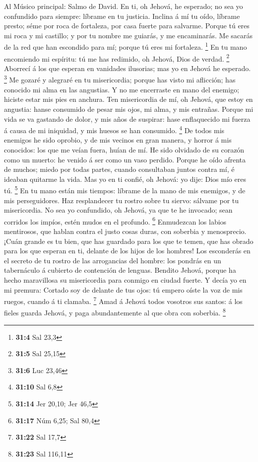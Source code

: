  Al Músico principal: Salmo de David. En ti, oh Jehová, he
esperado; no sea yo confundido para siempre: líbrame en tu justicia.
 Inclina á mí tu oído, líbrame presto; séme por roca de
fortaleza, por casa fuerte para salvarme.  Porque tú eres mi
roca y mi castillo; y por tu nombre me guiarás, y me encaminarás.
 Me sacarás de la red que han escondido para mí; porque tú
eres mi fortaleza. \footnote{\textbf{31:4} Sal 23,3}  En tu
mano encomiendo mi espíritu: tú me has redimido, oh Jehová, Dios de
verdad. \footnote{\textbf{31:5} Sal 25,15}  Aborrecí á los
que esperan en vanidades ilusorias; mas yo en Jehová he esperado.
\footnote{\textbf{31:6} Luc 23,46}  Me gozaré y alegraré en
tu misericordia; porque has visto mi aflicción; has conocido mi alma en
las angustias.  Y no me encerraste en mano del enemigo;
hiciste estar mis pies en anchura.  Ten misericordia de mí,
oh Jehová, que estoy en angustia: hanse consumido de pesar mis ojos, mi
alma, y mis entrañas.  Porque mi vida se va gastando de
dolor, y mis años de suspirar: hase enflaquecido mi fuerza á causa de mi
iniquidad, y mis huesos se han consumido. \footnote{\textbf{31:10} Sal
  6,8}  De todos mis enemigos he sido oprobio, y de mis
vecinos en gran manera, y horror á mis conocidos: los que me veían
fuera, huían de mí.  He sido olvidado de su corazón como un
muerto: he venido á ser como un vaso perdido.  Porque he
oído afrenta de muchos; miedo por todas partes, cuando consultaban
juntos contra mí, é ideaban quitarme la vida.  Mas yo en ti
confié, oh Jehová: yo dije: Dios mío eres tú. \footnote{\textbf{31:14}
  Jer 20,10; Jer 46,5}  En tu mano están mis tiempos:
líbrame de la mano de mis enemigos, y de mis perseguidores.
 Haz resplandecer tu rostro sobre tu siervo: sálvame por tu
misericordia.  No sea yo confundido, oh Jehová, ya que te
he invocado; sean corridos los impíos, estén mudos en el profundo.
\footnote{\textbf{31:17} Núm 6,25; Sal 80,4}  Enmudezcan
los labios mentirosos, que hablan contra el justo cosas duras, con
soberbia y menosprecio.  ¡Cuán grande es tu bien, que has
guardado para los que te temen, que has obrado para los que esperan en
ti, delante de los hijos de los hombres!  Los esconderás en
el secreto de tu rostro de las arrogancias del hombre: los pondrás en un
tabernáculo á cubierto de contención de lenguas.  Bendito
Jehová, porque ha hecho maravillosa su misericordia para conmigo en
ciudad fuerte.  Y decía yo en mi premura: Cortado soy de
delante de tus ojos: tú empero oíste la voz de mis ruegos, cuando á ti
clamaba. \footnote{\textbf{31:22} Sal 17,7}  Amad á Jehová
todos vosotros sus santos: á los fieles guarda Jehová, y paga
abundantemente al que obra con soberbia. \footnote{\textbf{31:23} Sal
  116,11}

